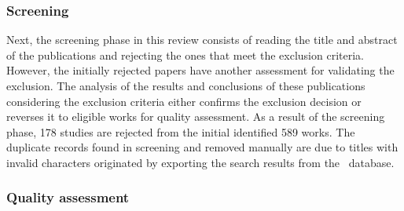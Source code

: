 \subsubsection{Screening}

Next, the screening phase in this review consists of reading the title and abstract of the publications and rejecting the ones that meet the exclusion criteria. However, the initially rejected papers have another assessment for validating the exclusion. The analysis of the results and conclusions of these publications considering the exclusion criteria either confirms the exclusion decision or reverses it to eligible works for quality assessment. As a result of the screening phase, 178 studies are rejected from the initial identified 589 works. The duplicate records found in screening and removed manually are due to titles with invalid characters originated by exporting the search results from the ~database.

\subsubsection{Quality assessment}

